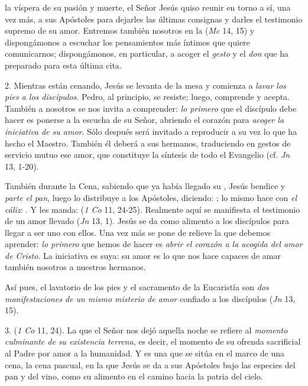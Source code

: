 \begin{body}
 la víspera de su pasión y muerte, el Señor Jesús quiso reunir en torno a sí, una vez más, a sus Apóstoles para dejarles las últimas consignas y darles el testimonio supremo de su amor. Entremos también nosotros en la  (\textit{Mc} 14, 15) y dispongámonos a escuchar los pensamientos más íntimos que quiere comunicarnos; dispongámonos, en particular, a acoger el \textit{gesto} y el \textit{don} que ha preparado para esta última cita.

2. Mientras están cenando, Jesús se levanta de la mesa y comienza a \textit{lavar los pies a los discípulos}. Pedro, al principio, se resiste; luego, comprende y acepta. También a nosotros se nos invita a comprender: \textit{lo primero} que el discípulo debe hacer es ponerse a la escucha de su Señor, abriendo el corazón para \textit{acoger la iniciativa de su amor}. Sólo después será invitado a reproducir a su vez lo que ha hecho el Maestro. También él deberá  a sus hermanos, traduciendo en gestos de servicio mutuo ese amor, que constituye la síntesis de todo el Evangelio (cf. \textit{Jn} 13, 1-20).

También durante la Cena, sabiendo que ya había llegado su , Jesús bendice y \textit{parte el pan}, luego lo distribuye a los Apóstoles, diciendo: ; lo mismo hace con \textit{el cáliz}: . Y les manda:  (\textit{1 Co} 11, 24-25). Realmente aquí se manifiesta el testimonio de un amor llevado  (\textit{Jn} 13, 1). Jesús se da como alimento a los discípulos para llegar a ser uno con ellos. Una vez más se pone de relieve la  que debemos aprender: \textit{lo primero} que hemos de hacer es \textit{abrir el corazón a la acogida del amor de Cristo}. La iniciativa es suya: su amor es lo que nos hace capaces de amar también nosotros a nuestros hermanos.

Así pues, el lavatorio de los pies y el sacramento de la Eucaristía son \textit{dos manifestaciones de un mismo misterio de amor} confiado a los discípulos  (\textit{Jn} 13, 15).

3.  (\textit{1 Co} 11, 24). La  que el Señor nos dejó aquella noche se refiere al \textit{momento culminante de su existencia terrena}, es decir, el momento de su ofrenda sacrificial al Padre por amor a la humanidad. Y es una  que se sitúa en el marco de una cena, la cena pascual, en la que Jesús se da a sus Apóstoles bajo las especies del pan y del vino, como su alimento en el camino hacia la patria del cielo.



\end{body}
